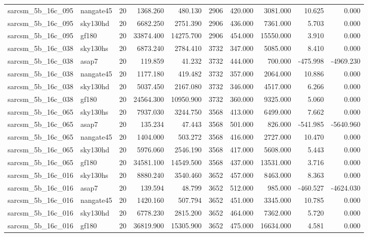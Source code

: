 \begin{tabular}{llrrrrrrrr}
sarcsm\_5b\_16c\_095 & nangate45 & 20 & 1368.260 & 480.130 & 2906 & 420.000 & 3081.000 & 10.625 & 0.000 \\
sarcsm\_5b\_16c\_095 & sky130hd & 20 & 6682.250 & 2751.390 & 2906 & 436.000 & 7361.000 & 5.703 & 0.000 \\
sarcsm\_5b\_16c\_095 & gf180 & 20 & 33874.400 & 14275.700 & 2906 & 454.000 & 15550.000 & 3.910 & 0.000 \\
sarcsm\_5b\_16c\_038 & sky130hs & 20 & 6873.240 & 2784.410 & 3732 & 347.000 & 5085.000 & 8.410 & 0.000 \\
sarcsm\_5b\_16c\_038 & asap7 & 20 & 119.859 & 41.232 & 3732 & 444.000 & 700.000 & -475.998 & -4969.230 \\
sarcsm\_5b\_16c\_038 & nangate45 & 20 & 1177.180 & 419.482 & 3732 & 357.000 & 2064.000 & 10.886 & 0.000 \\
sarcsm\_5b\_16c\_038 & sky130hd & 20 & 5037.450 & 2167.080 & 3732 & 346.000 & 4517.000 & 6.266 & 0.000 \\
sarcsm\_5b\_16c\_038 & gf180 & 20 & 24564.300 & 10950.900 & 3732 & 360.000 & 9325.000 & 5.060 & 0.000 \\
sarcsm\_5b\_16c\_065 & sky130hs & 20 & 7937.030 & 3244.750 & 3568 & 413.000 & 6499.000 & 7.662 & 0.000 \\
sarcsm\_5b\_16c\_065 & asap7 & 20 & 135.234 & 47.443 & 3568 & 501.000 & 826.000 & -541.985 & -5640.960 \\
sarcsm\_5b\_16c\_065 & nangate45 & 20 & 1404.000 & 503.272 & 3568 & 416.000 & 2727.000 & 10.470 & 0.000 \\
sarcsm\_5b\_16c\_065 & sky130hd & 20 & 5976.060 & 2546.190 & 3568 & 417.000 & 5608.000 & 5.443 & 0.000 \\
sarcsm\_5b\_16c\_065 & gf180 & 20 & 34581.100 & 14549.500 & 3568 & 437.000 & 13531.000 & 3.716 & 0.000 \\
sarcsm\_5b\_16c\_016 & sky130hs & 20 & 8880.240 & 3540.460 & 3652 & 457.000 & 8463.000 & 8.363 & 0.000 \\
sarcsm\_5b\_16c\_016 & asap7 & 20 & 139.594 & 48.799 & 3652 & 512.000 & 985.000 & -460.527 & -4624.030 \\
sarcsm\_5b\_16c\_016 & nangate45 & 20 & 1420.160 & 507.794 & 3652 & 451.000 & 3345.000 & 10.785 & 0.000 \\
sarcsm\_5b\_16c\_016 & sky130hd & 20 & 6778.230 & 2815.200 & 3652 & 464.000 & 7362.000 & 5.720 & 0.000 \\
sarcsm\_5b\_16c\_016 & gf180 & 20 & 36819.900 & 15305.900 & 3652 & 475.000 & 16634.000 & 4.581 & 0.000 \\

\end{tabular}
